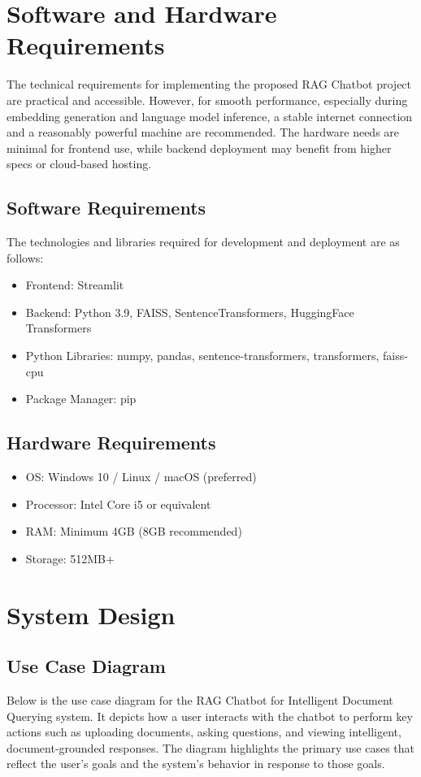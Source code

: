 \documentclass[12pt]{report}
\begin{document}
\chapter{Software and Hardware Requirements}
The technical requirements for implementing the proposed RAG Chatbot project are practical and accessible. However, for smooth performance, especially during embedding generation and language model inference, a stable internet connection and a reasonably powerful machine are recommended. The hardware needs are minimal for frontend use, while backend deployment may benefit from higher specs or cloud-based hosting.

\section{Software Requirements}
The technologies and libraries required for development and deployment are as follows:

\begin{itemize}
    \item Frontend: Streamlit
    \item Backend: Python 3.9, FAISS, SentenceTransformers, HuggingFace Transformers
    \item Python Libraries: numpy, pandas, sentence-transformers, transformers, faiss-cpu
    \item Package Manager: pip
\end{itemize}

\section{Hardware Requirements}
\begin{itemize}
    \item OS: Windows 10 / Linux / macOS (preferred)
    \item Processor: Intel Core i5 or equivalent
    \item RAM: Minimum 4GB (8GB recommended)
    \item Storage: 512MB+
\end{itemize}

\chapter{System Design}
\section{Use Case Diagram}
Below is the use case diagram for the RAG Chatbot for Intelligent Document Querying system. It depicts how a user interacts with the  chatbot to perform key actions such as uploading documents, asking questions, and viewing intelligent, document-grounded responses. The diagram highlights the primary use cases that reflect the user’s goals and   the system’s behavior in response to those goals.
\end{document}
